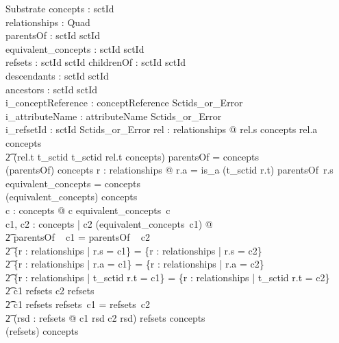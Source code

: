 \documentclass{article}
\begin{document}
\begin{schema}{Substrate}
   concepts : \power sctId \\
   relationships : \power Quad  \\
   parentsOf : sctId \pfun \power sctId \\
   equivalent\_concepts : sctId \pfun \power sctId \\
   refsets : sctId \pfun \power sctId 
\also
   childrenOf : sctId \pfun \power sctId \\
   descendants : sctId \pfun \power sctId \\
   ancestors : sctId \pfun \power sctId \\
\also
   i\_conceptReference : conceptReference \fun Sctids\_or\_Error \\
   i\_attributeName : attributeName \fun Sctids\_or\_Error \\
   i\_refsetId : sctId \fun Sctids\_or\_Error
\where
   \forall rel : relationships @  rel.s \in concepts \land rel.a \in concepts \land \\
\t2 (rel.t \in \ran t\_sctid \implies t\_sctid \inv rel.t \in concepts)
\also
   \dom parentsOf = concepts \\
   \bigcup (\ran parentsOf) \subseteq concepts
\also
   \forall r : relationships @ r.a = is\_a \implies (t\_sctid \inv r.t) \in parentsOf~r.s
\also
   \dom equivalent\_concepts = concepts \\
   \bigcup (\ran equivalent\_concepts) \subseteq concepts \\
  \forall c : concepts @ c \in equivalent\_concepts~c \\
  \forall c1, c2 : concepts | c2 \in (equivalent\_concepts~c1) @ \\
\t2 parentsOf ~ c1 = parentsOf ~ c2 \land \\
\t2 \{r : relationships | r.s = c1\} = \{r : relationships | r.s = c2\} \land \\
\t2 \{r : relationships | r.a = c1\} = \{r : relationships | r.a = c2\} \land \\
\t2 \{r : relationships | t\_sctid \inv r.t = c1\} = \{r : relationships | t\_sctid \inv r.t = c2\} \land \\
\t2 c1 \in \dom refsets \iff c2 \in \dom refsets \land \\
\t2 c1 \in \dom refsets \implies refsets~c1 = refsets~c2 \land \\
\t2 (\forall rsd : \ran refsets @ c1 \in rsd \iff c2 \in rsd)
\also
   \dom refsets \subseteq concepts \\
   \bigcup (\ran refsets) \subseteq concepts

\end{schema}
\end{document}
